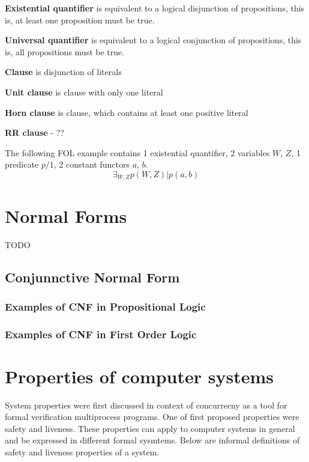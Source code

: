 \textbf{Existential quantifier}
is equivalent to a logical disjunction of propositions, this is, at least one proposition must be true.

\textbf{Universal quantifier}
is equivalent to a logical conjunction of propositions, this is, all propositions must be true.

\textbf{Clause}
is disjunction of literals

\textbf{Unit clause}
is clause with only one literal

\textbf{Horn clause}
is clause, which contains at least one positive literal

\textbf{RR clause} - ??

The following \gls{FOL} example contains 1 existential quantifier, 2 variables $W$, $Z$, 1 predicate $p/1$, 2 constant functors $a$, $b$.
\begin{equation} \label{eg:FOL_1}
  \exists_{W,Z} p(W,Z) | p(a, b)
\end{equation}

\section{Normal Forms}

TODO

\subsection{Conjunnctive Normal Form}

\subsubsection{Examples of CNF in Propositional Logic}

\subsubsection{Examples of CNF in First Order Logic}

\section{Properties of computer systems}

System properties were first discussed in context of concurrecny \cite{Lampert77} as a tool for formal verification multiprocess programs. One of first proposed properties were safety and liveness. These properties can apply to computer systems in general and be expressed in different formal sysmtems. Below are informal definitions of safety and liveness properties of a system.

